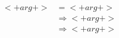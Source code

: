 \begin{align*}
	 <+arg+> &= <+arg+> \\
	&\Rightarrow <+arg+> \\
	&\Rightarrow \boxed{<+arg+>} 
\end{align*}


